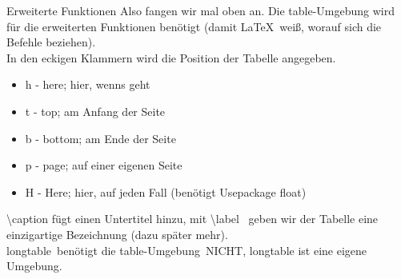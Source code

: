 \begin{frame}{Erweiterte Funktionen}
Also fangen wir mal oben an. Die \color{cpurple}table\color{black}-Umgebung wird f\"ur die erweiterten Funktionen ben\"otigt (damit \LaTeX~wei\ss, worauf sich die Befehle beziehen).\\
In den eckigen Klammern wird die Position der Tabelle angegeben.\\
\begin{itemize}
    \item h - \glqq here\grqq; hier, wenns geht
    \item t - \glqq top\grqq; am Anfang der Seite
    \item b - \glqq bottom\grqq; am Ende der Seite
    \item p - \glqq page\grqq; auf einer eigenen Seite
    \item H - \glqq Here\grqq; hier, auf jeden Fall (ben\"otigt Usepackage \color{cblue}float\color{black})
\end{itemize}
\color{cturkis}\textbackslash caption \color{black}f\"ugt einen Untertitel hinzu, mit \color{cblue}\textbackslash label~\color{black} geben wir der Tabelle eine einzigartige Bezeichnung (dazu sp\"ater mehr).\\
\vspace{3mm}\color{cpurple}longtable\color{black}~ben\"otigt die \color{cpurple}table\color{black}-Umgebung~NICHT, longtable ist eine eigene Umgebung.
\end{frame}